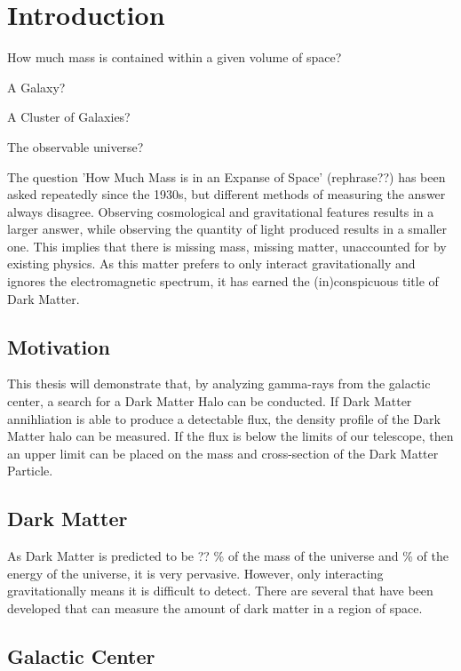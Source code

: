 \cleartooddpage[\thispagestyle{empty}]
\chapter{Introduction}

How much mass is contained within a given volume of space?

A Galaxy?

A Cluster of Galaxies?

The observable universe?

The question 'How Much Mass is in an Expanse of Space' (rephrase??) has been asked repeatedly since the 1930s, but different methods of measuring the answer always disagree.
Observing cosmological and gravitational features results in a larger answer, while observing the quantity of light produced results in a smaller one.
This implies that there is missing mass, missing matter, unaccounted for by existing physics.
As this matter prefers to only interact gravitationally and ignores the electromagnetic spectrum, it has earned the (in)conspicuous title of Dark Matter.

\section{Motivation}
This thesis will demonstrate that, by analyzing gamma-rays from the galactic center, a search for a Dark Matter Halo can be conducted.
If Dark Matter annihliation is able to produce a detectable flux, the density profile of the Dark Matter halo can be measured.
If the flux is below the limits of our telescope, then an upper limit can be placed on the mass and cross-section of the Dark Matter Particle.

\section{Dark Matter}

As Dark Matter is predicted to be ?? \% of the mass of the universe and \% of the energy of the universe, it is very pervasive.
However, only interacting gravitationally means it is difficult to detect.
There are several that have been developed that can measure the amount of dark matter in a region of space.



\section{Galactic Center}


